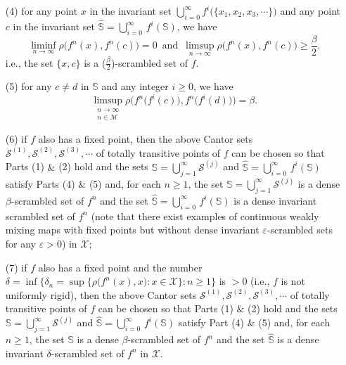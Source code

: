 \documentclass[12pt]{article}
\newcommand{\va}{\varepsilon}
\begin{document}
{\begin{itemize}
\item[{\rm (4)}]
for any point $x$ in the invariant set $\bigcup_{i=0}^\infty f^i\big(\{x_1, x_2, x_3, \cdots\}\big)$ and any point $c$ in the invariant set $\widehat {\mathbb S} = \bigcup_{i=0}^\infty \, f^i(\mathbb S)$, 
we have 
$$\liminf_{n \to \infty} \rho\big(f^n(x), f^n(c)\big) = 0 \,\,\, \text{and} \,\,\, \limsup_{n \to \infty} \rho\big(f^n(x), f^n(c)\big) \ge \frac \beta2.$$
i.e., the set $\{ x, c \}$ is a ($\frac {\beta}2$)-scrambled set of $f$.

\item[{\rm (5)}]
for any $c \ne d$ in $\mathbb S$ and any integer $i \ge 0$, we have 
$$
\limsup_{\substack{n \to \infty \\ n \in \mathcal M}} \rho\bigg(f^n\big(f^i(c)\big), f^n\big(f^i(d)\big)\bigg) = \beta.
$$

\item[{\rm (6)}]
if $f$ also has a fixed point, then the above Cantor sets $\mathcal S^{(1)}, \mathcal S^{(2)}, \mathcal S^{(3)}, \cdots$ of totally transitive points of $f$ can be chosen so that Parts (1) $\&$ (2) hold and the sets $\mathbb S = \bigcup_{j=1}^\infty \mathcal S^{(j)}$ and $\widehat {\mathbb S} = \bigcup_{i=0}^\infty \, f^i(\mathbb S)$ satisfy Parts (4) $\&$ (5) and, for each $n \ge 1$, the set $\mathbb S = \bigcup_{j=1}^\infty \mathcal S^{(j)}$ is a dense $\beta$-scrambled set of $f^n$ and the set $\widehat {\mathbb S} = \bigcup_{i=0}^\infty \, f^i(\mathbb S)$ is a dense {\rm invariant} scrambled set of $f^n$ \big(note that there exist examples {\bf\cite{liye}} of continuous weakly mixing maps with fixed points but without dense {\rm invariant} $\va$-scrambled sets for any $\va > 0$\big) in $\mathcal X$;

\item[{\rm (7)}]
if $f$ also has a fixed point and the number $\delta = \inf \big\{ \delta_n = \sup\{ \rho(f^n(x), x\big): x \in \mathcal X \}: n \ge 1 \big\}$ is $> 0$ \big(i.e., $f$ is not uniformly rigid\big), then the above Cantor sets $\mathcal S^{(1)}, \mathcal S^{(2)}, \mathcal S^{(3)}, \cdots$ of totally transitive points of $f$ can be chosen so that Parts (1) $\&$ (2) hold and the sets $\mathbb S = \bigcup_{j=1}^\infty \mathcal S^{(j)}$ and $\widehat {\mathbb S} = \bigcup_{i=0}^\infty \, f^i(\mathbb S)$ satisfy Part (4) $\&$ (5) and, for each $n \ge 1$, the set $\mathbb S$ is a dense $\beta$-scrambled set of $f^n$ and the set $\widehat {\mathbb S}$ is a dense {\rm invariant} $\delta$-scrambled set of $f^n$ in $\mathcal X$. 
\end{itemize}}
\end{document}
